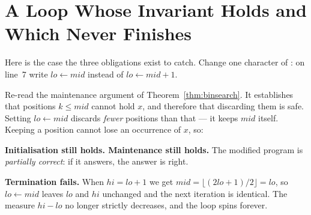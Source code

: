 \section{A Loop Whose Invariant Holds and Which Never Finishes}

Here is the case the three obligations exist to catch. Change one character of
: on line~7 write $\mathit{lo} \gets \mathit{mid}$
instead of $\mathit{lo} \gets \mathit{mid}+1$.

\begin{conceptbox}
Re-read the maintenance argument of Theorem~\ref{thm:binsearch}. It establishes
that positions $k \le \mathit{mid}$ cannot hold $x$, and therefore that
discarding them is safe. Setting $\mathit{lo} \gets \mathit{mid}$ discards
\emph{fewer} positions than that --- it keeps $\mathit{mid}$ itself. Keeping a
position cannot lose an occurrence of $x$, so:

\smallskip
\textbf{Initialisation still holds. Maintenance still holds.} The modified
program is \emph{partially correct}: if it answers, the answer is right.

\smallskip
\textbf{Termination fails.} When $\mathit{hi} = \mathit{lo}+1$ we get
$\mathit{mid} = \lfloor (2\mathit{lo}+1)/2 \rfloor = \mathit{lo}$, so
$\mathit{lo} \gets \mathit{mid}$ leaves $\mathit{lo}$ and $\mathit{hi}$
unchanged and the next iteration is identical. The measure
$\mathit{hi}-\mathit{lo}$ no longer strictly decreases, and the loop spins
forever.
\end{conceptbox}

